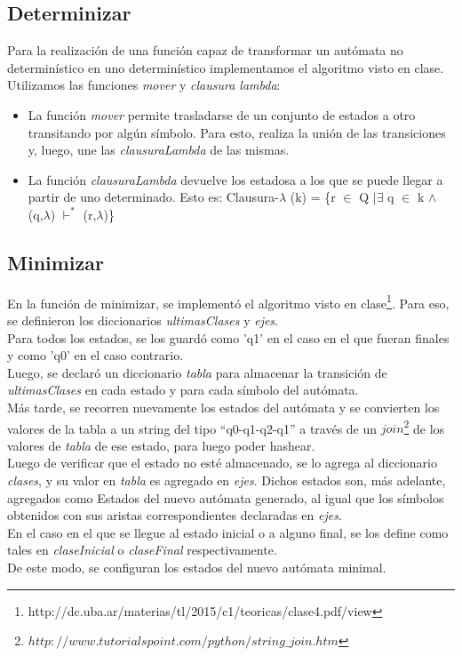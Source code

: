 \documentclass[a4paper, 10pt, twoside]{article}
\begin{document}
\subsection{Determinizar}
Para la realización de una función capaz de transformar un autómata no determinístico en uno determinístico implementamos el algoritmo visto en clase. Utilizamos las funciones \textit{mover} y \textit{clausura lambda}:
\begin{itemize}
\item La función \textit{mover} permite trasladarse de un conjunto de estados a otro transitando por algún símbolo. Para esto, realiza la unión de las transiciones y, luego, une las \textit{clausuraLambda} de las mismas.
\item La función \textit{clausuraLambda} devuelve los estadosa a los que se puede llegar a partir de uno determinado. Esto es:
Clausura-$\lambda$ (k) = \{r $\in$ Q $| \exists$ q $\in$ k $\land$ (q,$\lambda$) $\vdash^{*}$ (r,$\lambda$)\}
\end{itemize}

\subsection{Minimizar}
En la función de minimizar, se implementó el algoritmo visto en clase\footnote{http://dc.uba.ar/materias/tl/2015/c1/teoricas/clase4.pdf/view}. Para eso, se definieron los diccionarios \textit{ultimasClases} y \textit{ejes}.\\
Para todos los estados, se los guardó como 'q1' en el caso en el que fueran finales y como 'q0' en el caso contrario.\\
Luego, se declaró un diccionario \textit{tabla} para almacenar la transición de \textit{ultimasClases} en cada estado y para cada símbolo del autómata.\\
Más tarde, se recorren nuevamente los estados del autómata y se convierten los valores de la tabla a un string del tipo ``q0-q1-q2-q1'' a través de un $join$\footnote{$http://www.tutorialspoint.com/python/string\_join.htm$} de los valores de \textit{tabla} de ese estado, para luego poder hashear.\\
Luego de verificar que el estado no esté almacenado, se lo agrega al diccionario \textit{clases}, y su valor en \textit{tabla} es agregado en \textit{ejes}. Dichos estados son, más adelante, agregados como Estados del nuevo autómata generado, al igual que los símbolos obtenidos con sus aristas correspondientes declaradas en \textit{ejes}.\\
En el caso en el que se llegue al estado inicial o a alguno final, se los define como tales en \textit{claseInicial} o \textit{claseFinal} respectivamente.\\
De este modo, se configuran los estados del nuevo autómata minimal.
\end{document}

